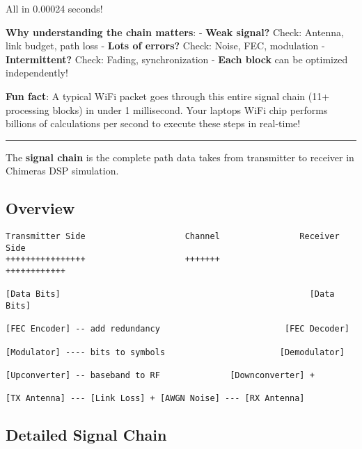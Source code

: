 All in 0.00024 seconds!

\textbf{Why understanding the chain matters}: - \textbf{Weak signal?}
Check: Antenna, link budget, path loss - \textbf{Lots of errors?} Check:
Noise, FEC, modulation - \textbf{Intermittent?} Check: Fading,
synchronization - \textbf{Each block} can be optimized independently!

\textbf{Fun fact}: A typical WiFi packet goes through this entire signal
chain (11+ processing blocks) in under 1 millisecond. Your
laptop\textquotesingle s WiFi chip performs billions of calculations per
second to execute these steps in real-time!

\begin{center}\rule{0.5\linewidth}{0.5pt}\end{center}

The \textbf{signal chain} is the complete path data takes from
transmitter to receiver in Chimera\textquotesingle s DSP simulation.

\subsection{Overview}\label{overview}

\begin{verbatim}
Transmitter Side                    Channel                Receiver Side
++++++++++++++++                    +++++++                ++++++++++++

[Data Bits]                                                  [Data Bits]
                                                                
[FEC Encoder] -- add redundancy                         [FEC Decoder]
                                                                
[Modulator] ---- bits to symbols                       [Demodulator]
                                                                
[Upconverter] -- baseband to RF              [Downconverter] +
                                                        
[TX Antenna] --- [Link Loss] + [AWGN Noise] --- [RX Antenna]
\end{verbatim}

\subsection{Detailed Signal Chain}\label{detailed-signal-chain}

